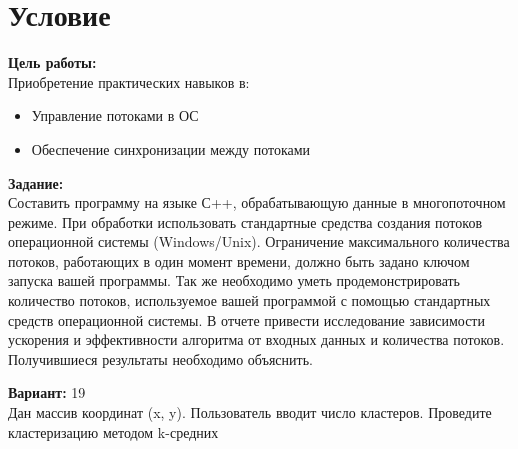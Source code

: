 \section{Условие}

{\bfseries Цель работы:} \\
Приобретение практических навыков в:
\begin{itemize}
\item Управление потоками в ОС 
\item Обеспечение синхронизации между потоками
\end{itemize}

{\bfseries Задание:} \\
Составить программу на языке С++, обрабатывающую данные в многопоточном режиме. 
При обработки использовать стандартные средства создания потоков операционной системы (Windows/Unix). 
Ограничение максимального количества потоков, работающих в один момент времени, должно быть задано ключом запуска вашей программы.
Так же необходимо уметь продемонстрировать количество потоков, используемое вашей программой с помощью стандартных средств операционной системы.
В отчете привести исследование зависимости ускорения и эффективности алгоритма от входных данных и количества потоков. Получившиеся результаты необходимо объяснить.

{\bfseries Вариант:} 19 \\
Дан массив координат (x, y).  Пользователь вводит число кластеров. Проведите кластеризацию методом k-средних
